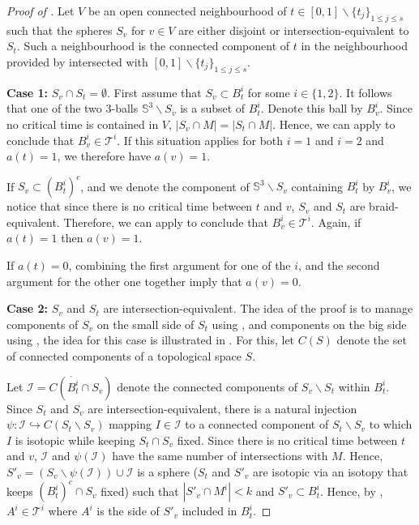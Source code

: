 \documentclass{article}
\newcommand{\Sp}{\mathbb{S}}
\newcommand{\T}{\mathcal{T}}
\begin{document}
\begin{proof}[Proof of ]
Let $V$ be an open connected neighbourhood of $t\in [0,1] \smallsetminus \{t_j\}_{1\leq j \leq s}$ such that the spheres $S_v$ for $v \in V$ are either disjoint or intersection-equivalent to $S_t$. Such a neighbourhood is the connected component of $t$ in the neighbourhood provided by  intersected with $[0,1] \smallsetminus \{t_j\}_{1\leq j \leq s}$.

\medskip

\noindent
{\bf Case 1:} $S_v \cap S_t = \emptyset$. First assume that $S_v \subset B_t^i$ for some $i \in \{1,2\}$. It follows that one of the two $3$-balls $\Sp^3 \smallsetminus S_v$ is a subset of $B^i_t$. Denote this ball by $B^i_v$. Since no critical time is contained in $V$, $|S_v \cap M| = |S_t \cap M|$. Hence, we can apply  to conclude that $B^i_v \in \T^i$. If this situation applies for both $i=1$ and $i=2$ and $a(t)=1$, we therefore have $a(v) = 1$.

If $S_v \subset (B_t^i)^{c}$, and we denote the component of $\Sp^3 \smallsetminus S_v$ containing $B^i_t$ by $B^i_v$, we notice that since there is no critical time between $t$ and $v$, $S_v$ and $S_t$ are braid-equivalent. Therefore, we can apply  to conclude that $B_v^i \in \T^i$. Again, if $a(t) = 1$ then $a(v) = 1$. 

If $a(t) = 0$, combining the first argument for one of the $i$, and the second argument for the other one together imply that $a(v) = 0$.

\medskip

\noindent
{\bf Case 2:} $S_v$ and $S_t$ are intersection-equivalent. The idea of the proof is to manage components of $S_v$ on the small side of $S_t$ using , and components on the big side using , the idea for this case is illustrated in . For this, let $C(S)$ denote the set of connected components of a topological space $S$.

Let $\mathcal{I} = C( \mathring{B^i_t} \cap S_v)$ denote the connected components of $S_v \smallsetminus S_t$ within $B^i_t$. Since $S_t$ and $S_v$ are intersection-equivalent, there is a natural injection $\psi : \mathcal{I} \hookrightarrow C (S_t \smallsetminus S_v)$ mapping $I \in \mathcal{I}$ to a connected component of $S_t \smallsetminus S_v$ to which $I$ is isotopic while keeping $S_t \cap S_v$ fixed. 
Since there is no critical time between $t$ and $v$, $\mathcal{I}$ and $\psi (\mathcal{I})$ have the same number of intersections with $M$. Hence, $S'_v = (S_v \smallsetminus \psi(\mathcal{I})) \cup \mathcal{I}$ is a sphere ($S_t$ and $S'_v$ are isotopic via an isotopy that keeps $(B^i_t)^c \cap S_v$ fixed) such that $|S'_v \cap M^i| < k$ and $S'_v \subset B^i_t$. Hence, by , $A^i \in \T^i$ where $A^i$ is the side of $S'_v$ included in $B^i_t$.


\end{proof}
\end{document}
